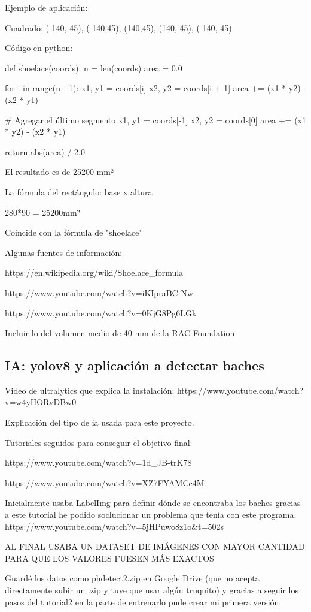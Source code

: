 Ejemplo de aplicación:

Cuadrado: (-140,-45), (-140,45), (140,45), (140,-45), (-140,-45)

Código en python:

def shoelace(coords):
n = len(coords)
area = 0.0

for i in range(n - 1):
x1, y1 = coords[i]
x2, y2 = coords[i + 1]
area += (x1 * y2) - (x2 * y1)

\# Agregar el último segmento
x1, y1 = coords[-1]
x2, y2 = coords[0]
area += (x1 * y2) - (x2 * y1)

return abs(area) / 2.0

El resultado es de 25200 mm²

La fórmula del rectángulo: base x altura

280*90 = 25200mm²

Coincide con la fórmula de "shoelace"

Algunas fuentes de información:

https://en.wikipedia.org/wiki/Shoelace\_formula

https://www.youtube.com/watch?v=iKIpraBC-Nw

https://www.youtube.com/watch?v=0KjG8Pg6LGk


Incluir lo del volumen medio de 40 mm de la RAC Foundation

\subsection{IA: yolov8 y aplicación a detectar baches}

\label{subsec:softwareiayolo}


Video de ultralytics que explica la instalación: https://www.youtube.com/watch?v=w4yHORvDBw0

Explicación del tipo de ia usada para este proyecto.

Tutoriales seguidos para conseguir el objetivo final: 

https://www.youtube.com/watch?v=1d\_JB-trK78

https://www.youtube.com/watch?v=XZ7FYAMCc4M


Inicialmente usaba LabelImg para definir dónde se encontraba los baches gracias a este tutorial he podido soclucionar un problema que tenía con este programa.  https://www.youtube.com/watch?v=5jHPuwo8z1o\&t=502s

AL FINAL USABA UN DATASET DE IMÁGENES CON MAYOR CANTIDAD PARA QUE LOS VALORES FUESEN MÁS EXACTOS

Guardé los datos como phdetect2.zip en Google Drive (que no acepta directamente subir un .zip y tuve que usar algún truquito) y gracias a seguir los pasos del tutorial2 en la parte de entrenarlo pude crear mi primera versión.


